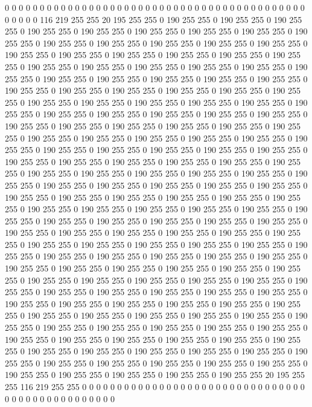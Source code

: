 0 0 0 0 0 0 0 0 0 0 0 0 0 0 0 0 0 0 0 0 0 0 0 0 0 0 0 0 0 0 0 0 0 0 0 0 0 0 0 0 0 0 0 0 0 0 0 0 116 219 255 255 20 195 255 255 0 190 255 255 0 190 255 255 0 190 255 255 0 190 255 255 0 190 255 255 0 190 255 255 0 190 255 255 0 190 255 255 0 190 255 255 0 190 255 255 0 190 255 255 0 190 255 255 0 190 255 255 0 190 255 255 0 190 255 255 0 190 255 255 0 190 255 255 0 190 255 255 0 190 255 255 0 190 255 255 0 190 255 255 0 190 255 255 0 190 255 255 0 190 255 255 0 190 255 255 0 190 255 255 0 190 255 255 0 190 255 255 0 190 255 255 0 190 255 255 0 190 255 255 0 190 255 255 0 190 255 255 0 190 255 255 0 190 255 255 0 190 255 255 
0 190 255 255 0 190 255 255 0 190 255 255 0 190 255 255 0 190 255 255 0 190 255 255 0 190 255 255 0 190 255 255 0 190 255 255 0 190 255 255 0 190 255 255 0 190 255 255 0 190 255 255 0 190 255 255 0 190 255 255 0 190 255 255 0 190 255 255 0 190 255 255 0 190 255 255 0 190 255 255 0 190 255 255 0 190 255 255 0 190 255 255 0 190 255 255 0 190 255 255 0 190 255 255 0 190 255 255 0 190 255 255 0 190 255 255 0 190 255 255 0 190 255 255 0 190 255 255 0 190 255 255 0 190 255 255 0 190 255 255 0 190 255 255 0 190 255 255 0 190 255 255 0 190 255 255 0 190 255 255 0 190 255 255 0 190 255 255 0 190 255 255 0 190 255 255 0 190 255 255 0 190 255 255 0 190 255 255 0 190 255 255 0 190 255 255 0 190 255 255 
0 190 255 255 0 190 255 255 0 190 255 255 0 190 255 255 0 190 255 255 0 190 255 255 0 190 255 255 0 190 255 255 0 190 255 255 0 190 255 255 0 190 255 255 0 190 255 255 0 190 255 255 0 190 255 255 0 190 255 255 0 190 255 255 0 190 255 255 0 190 255 255 0 190 255 255 0 190 255 255 0 190 255 255 0 190 255 255 0 190 255 255 0 190 255 255 0 190 255 255 0 190 255 255 0 190 255 255 0 190 255 255 0 190 255 255 0 190 255 255 0 190 255 255 0 190 255 255 0 190 255 255 0 190 255 255 0 190 255 255 0 190 255 255 0 190 255 255 0 190 255 255 0 190 255 255 0 190 255 255 0 190 255 255 0 190 255 255 0 190 255 255 0 190 255 255 0 190 255 255 0 190 255 255 0 190 255 255 0 190 255 255 0 190 255 255 0 190 255 255 
0 190 255 255 0 190 255 255 0 190 255 255 0 190 255 255 0 190 255 255 0 190 255 255 0 190 255 255 0 190 255 255 0 190 255 255 0 190 255 255 0 190 255 255 0 190 255 255 0 190 255 255 0 190 255 255 0 190 255 255 0 190 255 255 0 190 255 255 0 190 255 255 0 190 255 255 0 190 255 255 0 190 255 255 0 190 255 255 0 190 255 255 0 190 255 255 0 190 255 255 0 190 255 255 0 190 255 255 0 190 255 255 0 190 255 255 0 190 255 255 0 190 255 255 0 190 255 255 0 190 255 255 0 190 255 255 0 190 255 255 0 190 255 255 20 195 255 255 116 219 255 255 0 0 0 0 0 0 0 0 0 0 0 0 0 0 0 0 0 0 0 0 0 0 0 0 0 0 0 0 0 0 0 0 0 0 0 0 0 0 0 0 0 0 0 0 0 0 0 0 
